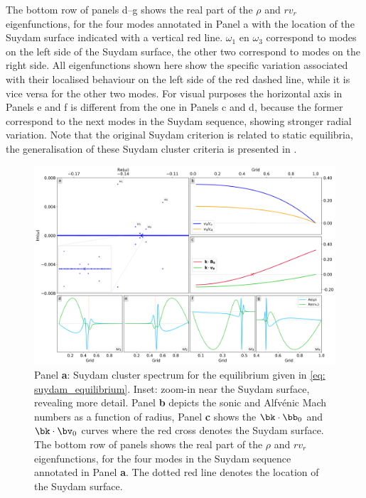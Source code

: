 The bottom row of panels d--g shows the real part of the $\rho$ and $r v_r$ eigenfunctions, for the four modes annotated in Panel a with the location of the Suydam surface indicated with a vertical red line. $\omega_1$ en $\omega_3$ correspond to modes on the left side of the Suydam surface, the other two correspond to modes on the right side. All eigenfunctions shown here show the specific variation associated with their localised behaviour on the left side of the red dashed line, while it is vice versa for the other two modes. For visual purposes the horizontal axis in Panels e and f is different from the one in Panels c and d, because the former correspond to the next modes in the Suydam sequence, showing stronger radial variation. Note that the original Suydam criterion \citep{book_MHD} is related to static equilibria, the generalisation of these Suydam cluster criteria is presented in \citet{wang2004}.

\begin{figure}[t]
  \centering
  \includegraphics[width=\textwidth]{suydam_cluster.png}
  \caption{
    Panel \textbf{a}: Suydam cluster spectrum for the equilibrium given in \eqref{eq: suydam_equilibrium}. Inset: zoom-in near the Suydam surface, revealing more detail. Panel \textbf{b} depicts the sonic and Alfv\'enic Mach numbers as a function of radius, Panel \textbf{c} shows the $\bk \cdot \bb_0$ and $\bk \cdot \bv_0$ curves where the red cross denotes the Suydam surface. The bottom row of panels shows the real part of the $\rho$ and $r v_r$ eigenfunctions, for the four modes in the Suydam sequence annotated in Panel \textbf{a}. The dotted red line denotes the location of the Suydam surface.
  }
  \label{fig: suydam_cluster}
\end{figure}



